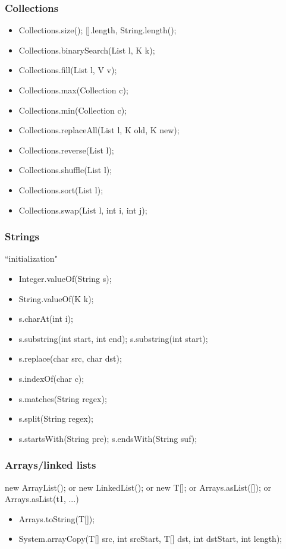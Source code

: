 \documentclass{article}
\begin{document}
\subsubsection{Collections}
\begin{itemize}
    \item Collections.size(); [].length, String.length();
    \item Collections.binarySearch(List l, K k);
    \item Collections.fill(List l, V v);
    \item Collections.max(Collection c);
    \item Collections.min(Collection c);
    \item Collections.replaceAll(List l, K old, K new);
    \item Collections.reverse(List l);
    \item Collections.shuffle(List l);
    \item Collections.sort(List l);
    \item Collections.swap(List l, int i, int j);
\end{itemize}
\subsubsection{Strings}
``initialization"
\begin{itemize}
    \item Integer.valueOf(String s);
    \item String.valueOf(K k);
    \item s.charAt(int i);
    \item s.substring(int start, int end); s.substring(int start);
    \item s.replace(char src, char dst);
    \item s.indexOf(char c);
    \item s.matches(String regex);
    \item s.split(String regex);
    \item s.startsWith(String pre); s.endsWith(String suf);
\end{itemize}
\subsubsection{Arrays/linked lists}
new ArrayList(); or new LinkedList(); or new T[]; or Arrays.asList([]); or Arrays.asList(t1, ...)
\begin{itemize}
    \item Arrays.toString(T[]);
    \item System.arrayCopy(T[] src, int srcStart, T[] dst, int dstStart, int length);
\end{itemize}
\end{document}
